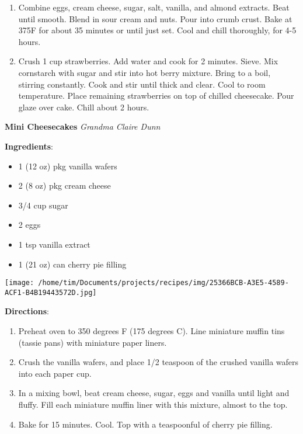 \documentclass[11pt, twoside, openany]{book}
\begin{document}
\begin{minipage}[t]{\linewidth}
\begin{enumerate}
\item Combine eggs, cream cheese, sugar, salt, vanilla, and almond extracts. Beat until smooth. Blend in sour cream and nuts. Pour into crumb crust. Bake at 375F for about 35 minutes or until just set. Cool and chill thoroughly, for 4-5 hours.
\item Crush 1 cup strawberries. Add water and cook for 2 minutes. Sieve. Mix cornstarch with sugar and stir into hot berry mixture. Bring to a boil, stirring constantly. Cook and stir until thick and clear. Cool to room temperature. Place remaining strawberries on top of chilled cheesecake. Pour glaze over cake. Chill about 2 hours.
\end{enumerate}
\end{minipage}\vspace{8mm}
\noindent\begin{minipage}[t]{\linewidth}%
{\Large\textbf{Mini Cheesecakes}} \label{mini-cheesecakes}\hfill\textit{Grandma Claire Dunn}\\
\noindent\begin{minipage}[t]{0.78\linewidth}%
\textbf{Ingredients}:\vspace{-3mm}
\begin{multicols}{2}
\begin{itemize}\setlength\itemsep{-1mm}
\item 1 (12 oz) pkg vanilla wafers
\item 2 (8 oz) pkg cream cheese
\item 3/4 cup sugar
\item 2 eggs
\item 1 tsp vanilla extract
\item 1 (21 oz) can cherry pie filling
\end{itemize}
\end{multicols}
\end{minipage}
\noindent\begin{minipage}[t]{0.18\linewidth}
\centering \strut\vspace*{-\baselineskip}\newline
\texttt{[image: /home/tim/Documents/projects/recipes/img/25366BCB-A3E5-4589-ACF1-B4B19443572D.jpg]}\\
\end{minipage}\vspace{3mm}
\textbf{Directions}:
\vspace{-3mm}\begin{enumerate}\setlength\itemsep{-1mm}
\item Preheat oven to 350 degrees F (175 degrees C). Line miniature muffin tins (tassie pans) with miniature paper liners.
\item Crush the vanilla wafers, and place 1/2 teaspoon of the crushed vanilla wafers into each paper cup.
\item In a mixing bowl, beat cream cheese, sugar, eggs and vanilla until light and fluffy. Fill each miniature muffin liner with this mixture, almost to the top.
\item Bake for 15 minutes. Cool. Top with a teaspoonful of cherry pie filling.
\end{enumerate}
\end{minipage}\vspace{8mm}
\end{document}
